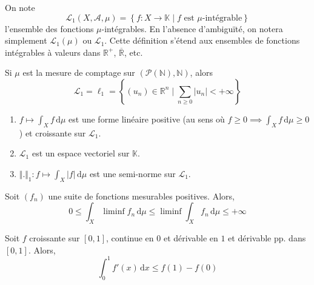   \begin{definition}
    \label{234-1}
    On note
    \[ \mathcal{L}_1(X, \mathcal{A}, \mu) = \left\{ f : X \rightarrow \mathbb{K} \mid f \text{ est } \mu\text{-intégrable} \right\} \]
    l'ensemble des fonctions $\mu$-intégrables. En l'absence d'ambiguïté, on notera simplement $\mathcal{L}_1(\mu)$ ou $\mathcal{L}_1$. Cette définition s'étend aux ensembles de fonctions intégrables à valeurs dans $\mathbb{R}^+$, $\overline{\mathbb{R}}$, etc.
  \end{definition}

  \begin{example}
    Si $\mu$ est la mesure de comptage sur $(\mathcal{P}(\mathbb{N}), \mathbb{N})$, alors
    \[ \mathcal{L}_1 = \ell_1 = \left\{ (u_n) \in \mathbb{R}^n \mid \sum_{n \geq 0} \vert u_n \vert < +\infty \right\} \]
  \end{example}

  \begin{theorem}
    \begin{enumerate}[label={\bfseries(\roman*)}]
      \item $f \mapsto \int_X f \, \mathrm{d}\mu$ est une forme linéaire positive (au sens où $f \geq 0 \implies \int_X f \, \mathrm{d}\mu \geq 0$) et croissante sur $\mathcal{L}_1$.
      \item $\mathcal{L}_1$ est un espace vectoriel sur $\mathbb{K}$.
      \item $\Vert . \Vert_1 : f \mapsto \int_X \vert f \vert \, \mathrm{d}\mu$ est une semi-norme sur $\mathcal{L}_1$.
    \end{enumerate}
  \end{theorem}


  \begin{theorem}
    Soit $(f_n)$ une suite de fonctions mesurables positives. Alors,
    \[ 0 \leq \int_X \liminf f_n \, \mathrm{d}\mu \leq \liminf \int_X f_n \, \mathrm{d}\mu \leq +\infty \]
  \end{theorem}

  \begin{example}
    \label{234-2}
    Soit $f$ croissante sur $[0,1]$, continue en $0$ et dérivable en $1$ et dérivable pp. dans $[0,1]$. Alors,
    \[ \int_{0}^{1} f'(x) \, \mathrm{d}x \leq f(1) - f(0) \]
  \end{example}

